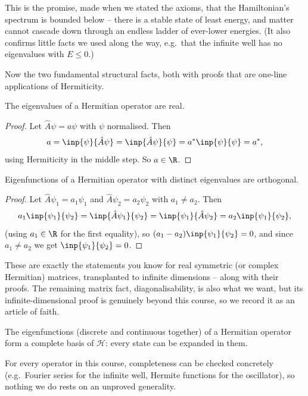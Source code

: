This is the promise, made when we stated the axioms, that the Hamiltonian's spectrum is bounded below -- there is a stable state of least energy, and matter cannot cascade down through an endless ladder of ever-lower energies. (It also confirms little facts we used along the way, e.g.\ that the infinite well has no eigenvalues with $E \leq 0$.)

Now the two fundamental structural facts, both with proofs that are one-line applications of Hermiticity.

\begin{proposition}
    The eigenvalues of a Hermitian operator are real.
\end{proposition}
\begin{proof}
    Let $\hat{A} \psi = a \psi$ with $\psi$ normalised. Then
    $$
    a = \inp{\psi}{\hat{A} \psi} = \inp{\hat{A}\psi}{\psi} = a^* \inp{\psi}{\psi} = a^*,
    $$
    using Hermiticity in the middle step. So $a \in \R$.
\end{proof}

\begin{proposition}
    Eigenfunctions of a Hermitian operator with distinct eigenvalues are orthogonal.
\end{proposition}
\begin{proof}
    Let $\hat{A}\psi_1 = a_1 \psi_1$ and $\hat{A} \psi_2 = a_2 \psi_2$ with $a_1 \neq a_2$. Then
    $$
    a_1 \inp{\psi_1}{\psi_2} = \inp{\hat A \psi_1}{\psi_2} = \inp{\psi_1}{\hat{A} \psi_2} = a_2 \inp{\psi_1}{\psi_2},
    $$
    (using $a_1 \in \R$ for the first equality), so $(a_1 - a_2)\inp{\psi_1}{\psi_2} = 0$, and since $a_1 \neq a_2$ we get $\inp{\psi_1}{\psi_2} = 0$.
\end{proof}

These are exactly the statements you know for real symmetric (or complex Hermitian) matrices, transplanted to infinite dimensions -- along with their proofs. The remaining matrix fact, diagonalisability, is also what we want, but its infinite-dimensional proof is genuinely beyond this course, so we record it as an article of faith.

\begin{fact}
    The eigenfunctions (discrete and continuous together) of a Hermitian operator form a complete basis of $\mathcal{H}$: every state can be expanded in them.
\end{fact}

For every operator in this course, completeness can be checked concretely (e.g.\ Fourier series for the infinite well, Hermite functions for the oscillator), so nothing we do rests on an unproved generality.

